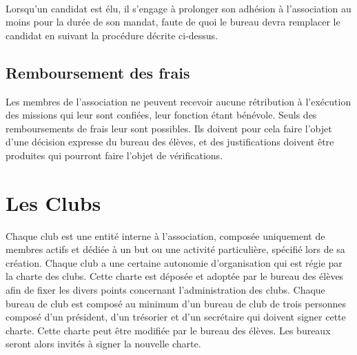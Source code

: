 \documentclass{article} %
\begin{document}
            \paragraph{}	
			Lorsqu’un candidat est élu, il s’engage à prolonger son adhésion
			à l’association au moins pour la durée de son mandat, faute de
			quoi le bureau devra remplacer le candidat en suivant
			la procédure décrite ci-dessus.
			
			
			
		\subsection{Remboursement des frais}
\label{sub:remboursement_des_frais}

			Les membres de l’association ne peuvent recevoir aucune rétribution
			à l'exécution des missions qui leur sont confiées, leur fonction
			étant bénévole. Seuls des remboursements de frais leur sont
			possibles. Ils doivent pour cela faire l'objet d'une décision
			expresse du bureau des élèves, et des justifications doivent être
			produites qui pourront faire l'objet de vérifications.

	\section{Les Clubs}
\label{sec:les_clubs}

		Chaque club est une entité interne à l’association, composée uniquement de
		membres actifs et dédiée à un but ou une activité particulière, spécifié lors
		de sa création. Chaque club a une certaine autonomie d'organisation qui est
		régie par la charte des clubs. Cette charte est déposée et adoptée par le
		bureau des élèves afin de fixer les divers points concernant l’administration
		des clubs. Chaque bureau de club est composé au minimum d’un bureau de club
		de trois personnes composé d’un président, d’un trésorier et d’un secrétaire
		qui doivent signer cette charte. Cette charte peut être modifiée par le
		bureau des élèves. Les bureaux seront alors invités à signer la nouvelle
		charte.
\end{document}
